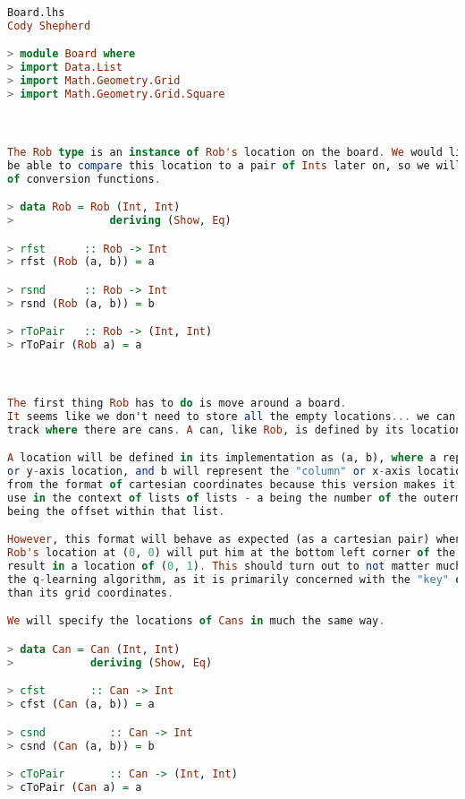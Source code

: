 \documentclass[12pt,a4paper]{article}
\begin{document}
	\begin{lstlisting}[language=Haskell,numbers=none,basicstyle=\tiny]
Board.lhs
Cody Shepherd

> module Board where
> import Data.List
> import Math.Geometry.Grid
> import Math.Geometry.Grid.Square



The Rob type is an instance of Rob's location on the board. We would like to 
be able to compare this location to a pair of Ints later on, so we will provide a couple
of conversion functions.

> data Rob = Rob (Int, Int)
>               deriving (Show, Eq)

> rfst      :: Rob -> Int
> rfst (Rob (a, b)) = a

> rsnd      :: Rob -> Int
> rsnd (Rob (a, b)) = b

> rToPair   :: Rob -> (Int, Int)
> rToPair (Rob a) = a



The first thing Rob has to do is move around a board. 
It seems like we don't need to store all the empty locations... we can just
track where there are cans. A can, like Rob, is defined by its location.

A location will be defined in its implementation as (a, b), where a represents the "row"
or y-axis location, and b will represent the "column" or x-axis location. This is reversed
from the format of cartesian coordinates because this version makes it much easier to 
use in the context of lists of lists - a being the number of the outermost list, and b 
being the offset within that list. 

However, this format will behave as expected (as a cartesian pair) when visualized. I.e. specifying
Rob's location at (0, 0) will put him at the bottom left corner of the grid, and moving him up will
result in a location of (0, 1). This should turn out to not matter much in the actual execution of
the q-learning algorithm, as it is primarily concerned with the "key" of each grid square rather 
than its grid coordinates.

We will specify the locations of Cans in much the same way.

> data Can = Can (Int, Int)
>            deriving (Show, Eq)

> cfst       :: Can -> Int
> cfst (Can (a, b)) = a

> csnd          :: Can -> Int
> csnd (Can (a, b)) = b

> cToPair       :: Can -> (Int, Int)
> cToPair (Can a) = a



\end{lstlisting}
\end{document}
